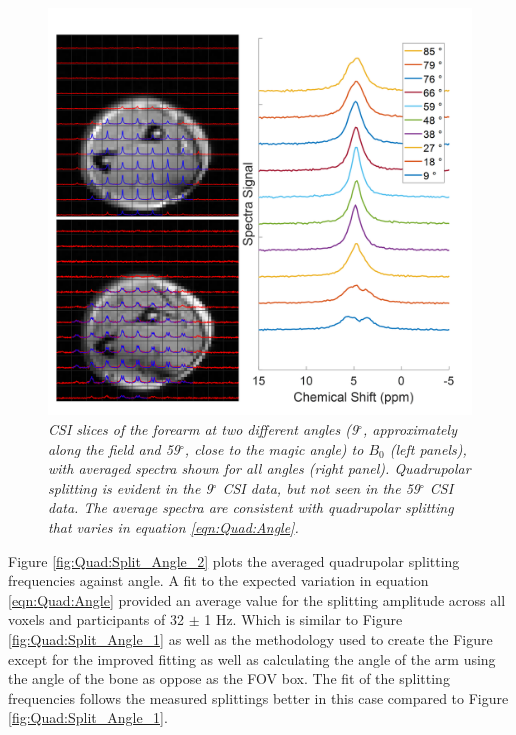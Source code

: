 \documentclass[class=article, crop=false]{standalone}
\begin{document}
\begin{figure}
    \centering
    \includegraphics[width=1\textwidth]{Figures/Quad/Arm_CSI_Angle.png}
    \caption{\textit{CSI slices of the forearm at two different angles (9$^\circ$, approximately along the field and 59$^\circ$, close to the magic angle) to $B_0$ (left panels), with averaged spectra shown for all angles (right panel). Quadrupolar splitting is evident in the 9$^\circ$ CSI data, but not seen in the 59$^\circ$ CSI data. The average spectra are consistent with quadrupolar splitting that varies in equation \ref{eqn:Quad:Angle}.}}
    \label{fig:Quad:Arm_CSI}
\end{figure}

 Figure \ref{fig:Quad:Split_Angle_2} plots the averaged quadrupolar splitting frequencies against angle. A fit to the expected variation in equation \ref{eqn:Quad:Angle} provided an average value for the splitting amplitude across all voxels and participants of 32 $\pm$ 1 Hz. Which is similar to Figure \ref{fig:Quad:Split_Angle_1} as well as the methodology used to create the Figure except for the improved fitting as well as calculating the angle of the arm using the angle of the bone as oppose as the FOV box. The fit of the splitting frequencies follows the measured splittings better in this case compared to Figure \ref{fig:Quad:Split_Angle_1}.
\end{document}
